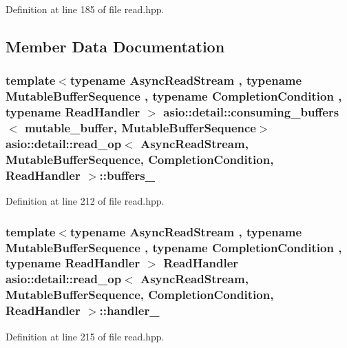 Definition at line 185 of file read.\+hpp.



\subsection{Member Data Documentation}
\hypertarget{classasio_1_1detail_1_1read__op_a71375abf74b7e1a1fffaa23c770a6e74}{}
\subsubsection[{buffers\+\_\+}]{\setlength{\rightskip}{0pt plus 5cm}template$<$typename Async\+Read\+Stream , typename Mutable\+Buffer\+Sequence , typename Completion\+Condition , typename Read\+Handler $>$ {\bf asio\+::detail\+::consuming\+\_\+buffers}$<$ {\bf mutable\+\_\+buffer}, Mutable\+Buffer\+Sequence$>$ {\bf asio\+::detail\+::read\+\_\+op}$<$ Async\+Read\+Stream, Mutable\+Buffer\+Sequence, Completion\+Condition, Read\+Handler $>$\+::buffers\+\_\+}\label{classasio_1_1detail_1_1read__op_a71375abf74b7e1a1fffaa23c770a6e74}


Definition at line 212 of file read.\+hpp.

\hypertarget{classasio_1_1detail_1_1read__op_a0306b644536860cbf0ef90aeef05725b}{}
\subsubsection[{handler\+\_\+}]{\setlength{\rightskip}{0pt plus 5cm}template$<$typename Async\+Read\+Stream , typename Mutable\+Buffer\+Sequence , typename Completion\+Condition , typename Read\+Handler $>$ Read\+Handler {\bf asio\+::detail\+::read\+\_\+op}$<$ Async\+Read\+Stream, Mutable\+Buffer\+Sequence, Completion\+Condition, Read\+Handler $>$\+::handler\+\_\+}\label{classasio_1_1detail_1_1read__op_a0306b644536860cbf0ef90aeef05725b}


Definition at line 215 of file read.\+hpp.

\hypertarget{classasio_1_1detail_1_1read__op_a5ca22131fe58d48d2d61baf61c0f7de5}{}
